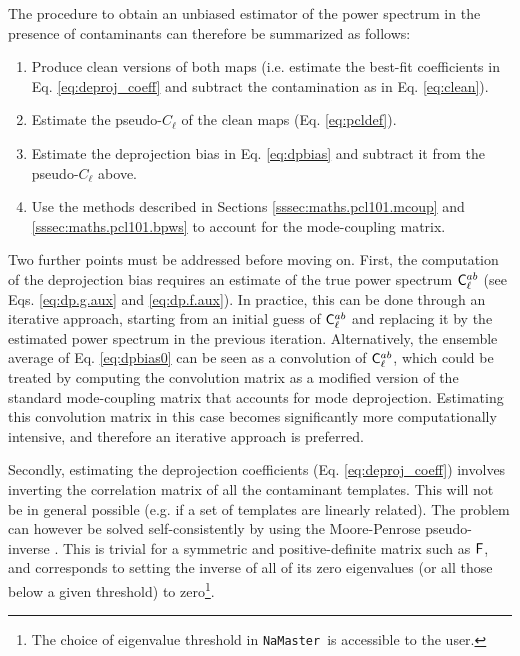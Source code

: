 \documentclass[usenatbib]{mnrasb}
\newcommand{\nmt}{{\tt NaMaster}}
\begin{document}
      The procedure to obtain an unbiased estimator of the power spectrum in the presence of contaminants can therefore be summarized as follows:
      \begin{enumerate}
        \item Produce clean versions of both maps (i.e. estimate the best-fit coefficients in Eq. \ref{eq:deproj_coeff} and subtract the contamination as in Eq. \ref{eq:clean}).
        \item Estimate the pseudo-$C_\ell$ of the clean maps (Eq. \ref{eq:pcldef}).
        \item Estimate the deprojection bias in Eq. \ref{eq:dpbias} and subtract it from the pseudo-$C_\ell$ above.
        \item Use the methods described in Sections \ref{sssec:maths.pcl101.mcoup} and  \ref{sssec:maths.pcl101.bpws} to account for the mode-coupling matrix.        
      \end{enumerate}
      
      Two further points must be addressed before moving on. First, the computation of the deprojection bias requires an estimate of the true power spectrum ${\sf C}^{ab}_\ell$ (see Eqs. \ref{eq:dp.g.aux} and \ref{eq:dp.f.aux}). In practice, this can be done through an iterative approach, starting from an initial guess of ${\sf C}^{ab}_\ell$ and replacing it by the estimated power spectrum in the previous iteration. Alternatively, the ensemble average of Eq. \ref{eq:dpbias0} can be seen as a convolution of ${\sf C}^{ab}_\ell$, which could be treated by computing the convolution matrix as a modified version of the standard mode-coupling matrix that accounts for mode deprojection. Estimating this convolution matrix in this case becomes significantly more computationally intensive, and therefore an iterative approach is preferred. 
      
      Secondly, estimating the deprojection coefficients (Eq. \ref{eq:deproj_coeff}) involves inverting the correlation matrix of all the contaminant templates. This will not be in general possible (e.g. if a set of templates are linearly related). The problem can however be solved self-consistently by using the Moore-Penrose pseudo-inverse \citep{2017MNRAS.465.1847E}. This is trivial for a symmetric and positive-definite matrix such as ${\sf F}$, and corresponds to setting the inverse of all of its zero eigenvalues (or all those below a given threshold) to zero\footnote{The choice of eigenvalue threshold in \nmt~is accessible to the user.}.
      
\end{document}
